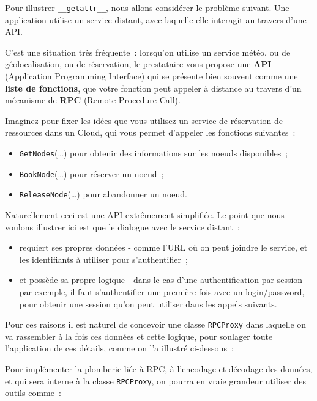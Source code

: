     Pour illustrer \texttt{\_\_getattr\_\_}, nous allons considérer le
problème suivant. Une application utilise un service distant, avec
laquelle elle interagit au travers d'une API.

C'est une situation très fréquente~: lorsqu'on utilise un service météo,
ou de géolocalisation, ou de réservation, le prestataire vous propose
une \textbf{API} (Application Programming Interface) qui se présente
bien souvent comme une \textbf{liste de fonctions}, que votre fonction
peut appeler à distance au travers d'un mécanisme de \textbf{RPC}
(Remote Procedure Call).

Imaginez pour fixer les idées que vous utilisez un service de
réservation de ressources dans un Cloud, qui vous permet d'appeler les
fonctions suivantes~:

\begin{itemize}
\tightlist
\item
  \texttt{GetNodes}(\ldots{}) pour obtenir des informations sur les
  noeuds disponibles~;
\item
  \texttt{BookNode}(\ldots{}) pour réserver un noeud~;
\item
  \texttt{ReleaseNode}(\ldots{}) pour abandonner un noeud.
\end{itemize}

    Naturellement ceci est une API extrêmement simplifiée. Le point que nous
voulons illustrer ici est que le dialogue avec le service distant~:

\begin{itemize}
\tightlist
\item
  requiert ses propres données - comme l'URL où on peut joindre le
  service, et les identifiants à utiliser pour s'authentifier~;
\item
  et possède sa propre logique - dans le cas d'une authentification par
  session par exemple, il faut s'authentifier une première fois avec un
  login/password, pour obtenir une session qu'on peut utiliser dans les
  appels suivants.
\end{itemize}

    Pour ces raisons il est naturel de concevoir une classe
\texttt{RPCProxy} dans laquelle on va rassembler à la fois ces données
et cette logique, pour soulager toute l'application de ces détails,
comme on l'a illustré ci-dessous~:

    Pour implémenter la plomberie liée à RPC, à l'encodage et décodage des
données, et qui sera interne à la classe \texttt{RPCProxy}, on pourra en
vraie grandeur utiliser des outils comme~:

